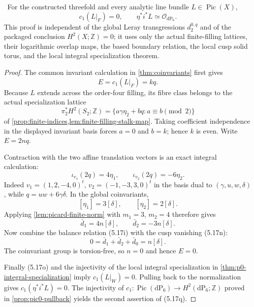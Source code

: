 \begin{proposition}
\label{prop:direct-boundary-picard}
\Verified\ For the constructed threefold and every analytic line bundle
$L\in\operatorname{Pic}(X)$,
\[
 c_1(L|_F)=0,
 \qquad
 \eta^*i^*L\simeq\mathcal O_{\mathrm{dP}_6}.
\tag{5.17q}
\]
This proof is independent of the global Leray transgressions
$d_2^{0,q}$ and of the packaged conclusion $H^2(X;\mathbb Z)=0$; it uses
only the actual finite-filling lattices, their logarithmic overlap maps, the
based boundary relation, the local cusp solid torus, and the local integral
specialization theorem.
\end{proposition}

\begin{proof}
The common invariant calculation in \cref{thm:coinvariants} first gives
\[
 E=c_1(L|_F)=kq.
\]
Because $L$ extends across the order-four filling, its fibre class belongs
to the actual specialization lattice
\[
 \pi_2^*H^2(S_2;\mathbb Z)
 =\{a\gamma\eta_2+bq:a\equiv b\pmod2\}
\]
of \cref{prop:finite-indices,lem:finite-filling-stalk-map}.  Taking
coefficient independence in the displayed invariant basis forces
$a=0$ and $b=k$; hence $k$ is even.  Write $E=2nq$.

Contraction with the two affine translation vectors is an exact integral
calculation:
\[
 \iota_{v_1}(2q)=4\eta_1,
 \qquad
 \iota_{v_2}(2q)=-6\eta_2.
\tag{5.17r}
\]
Indeed $v_1=(1,2,-4,0)^t$, $v_2=(-1,-3,3,0)^t$ in the basis dual to
$(\gamma,u,w,\delta)$, while
$q=uw+6\gamma\delta$.  In the global coinvariants,
\[
 [\eta_1]=3[\delta],\qquad [\eta_2]=2[\delta].
\]
Applying \cref{lem:picard-finite-norm} with $m_1=3$, $m_2=4$ therefore
gives
\[
 \bar d_1=4n[\delta],\qquad
 \bar d_2=-3n[\delta].
\tag{5.17s}
\]
Now combine the balance relation (5.17i) with the cusp vanishing (5.17n):
\[
 0=\bar d_1+\bar d_2+\bar d_0=n[\delta].
\]
The coinvariant group is torsion-free, so $n=0$ and hence $E=0$.

Finally (5.17o) and the injectivity of the local integral specialization in
\cref{thm:p0-integral-specialization} imply
$c_1(L|_W)=0$.  Pulling back to the normalization gives
$c_1(\eta^*i^*L)=0$.  The injectivity of
$c_1:\operatorname{Pic}(\mathrm{dP}_6)\to
H^2(\mathrm{dP}_6;\mathbb Z)$ proved in
\cref{prop:pic0-pullback} yields the second assertion of (5.17q).
\end{proof}



